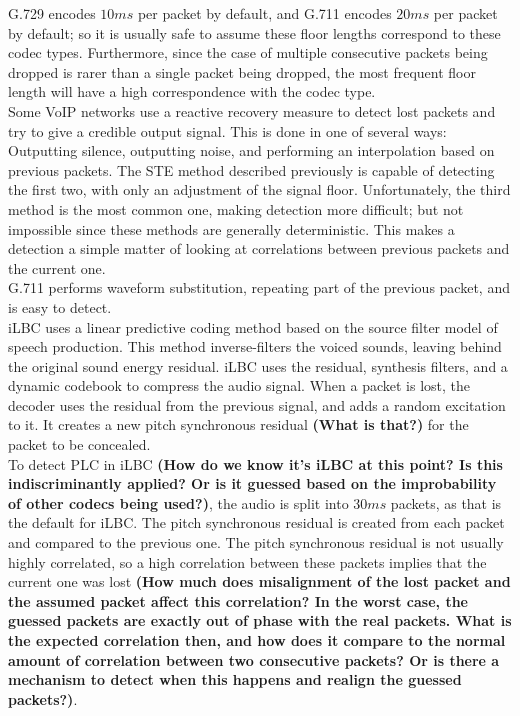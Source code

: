 \documentclass{article}
\begin{document}
G.729 encodes $10 ms$ per packet by default, and G.711 encodes $20 ms$ per packet by default;
so it is usually safe to assume these floor lengths correspond to these codec types.
Furthermore, since the case of multiple consecutive packets being dropped is rarer than a single packet being dropped,
the most frequent floor length will have a high correspondence with the codec type.\\
Some VoIP networks use a reactive recovery measure to detect lost packets and try to give a credible output signal.
This is done in one of several ways: Outputting silence, outputting noise,
and performing an interpolation based on previous packets.
The STE method described previously is capable of detecting the first two, with only an adjustment of the signal floor.
Unfortunately, the third method is the most common one, making detection more difficult;
but not impossible since these methods are generally deterministic.
This makes a detection a simple matter of looking at correlations between previous packets and the current one.\\
G.711 performs waveform substitution, repeating part of the previous packet, and is easy to detect.\\
iLBC uses a linear predictive coding method based on the source filter model of speech production.
This method inverse-filters the voiced sounds, leaving behind the original sound energy residual.
iLBC uses the residual, synthesis filters, and a dynamic codebook to compress the audio signal.
When a packet is lost, the decoder uses the residual from the previous signal,
and adds a random excitation to it.
It creates a new pitch synchronous residual {\bf(What is that?)} for the packet to be concealed.\\
To detect PLC in iLBC
{\bf(How do we know it's iLBC at this point? Is this indiscriminantly applied?
  Or is it guessed based on the improbability of other codecs being used?)},
the audio is split into $30 ms$ packets, as that is the default for iLBC.
The pitch synchronous residual is created from each packet and compared to the previous one.
The pitch synchronous residual is not usually highly correlated,
so a high correlation between these packets implies that the current one was lost
{\bf(How much does misalignment of the lost packet and the assumed packet affect this correlation?
  In the worst case, the guessed packets are exactly out of phase with the real packets.
  What is the expected correlation then,
  and how does it compare to the normal amount of correlation between two consecutive packets?
  Or is there a mechanism to detect when this happens and realign the guessed packets?)}.
\end{document}
